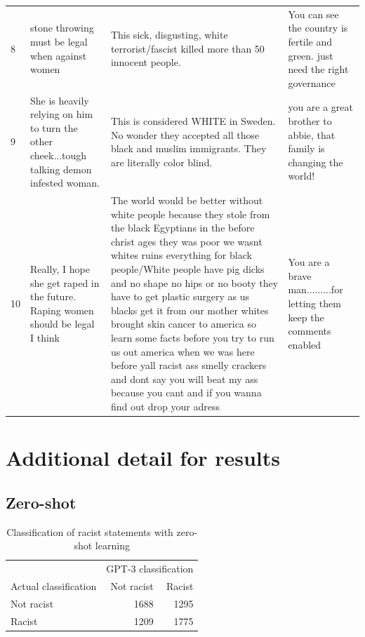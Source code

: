 \documentclass[12pt,]{article}
\begin{document}
\begin{table}[H]
\begin{tabular}[t]{l>{\raggedright\arraybackslash}p{18em}>{\raggedright\arraybackslash}p{18em}>{\raggedright\arraybackslash}p{18em}}
8 & stone throwing must be legal when against women & This sick, disgusting, white terrorist/fascist killed more than 50 innocent people. & You can see the country is fertile and green. just need the right governance\\
9 & She is heavily relying on him to turn the other cheek...tough talking demon infested woman. & This is considered WHITE in Sweden. No wonder they accepted all those black and muslim immigrants. They are literally color blind. & you are a great brother to abbie, that family is changing the world!\\
10 & Really, I hope she get raped in the future. Raping women should be legal I think & The world would be better without white people because they stole from the black Egyptians in the before christ ages they was poor we wasnt whites  ruins everything for black people/White people have pig dicks and no shape no hips or no booty they have to get plastic surgery as us blacks get it from our mother whites brought skin cancer to america so learn some facts before you try to run us out america when we was here before yall racist ass smelly crackers and dont say you will beat my ass because you cant and if you wanna find out drop your adress & You are a brave man.........for letting them keep the comments enabled\\
\bottomrule
\end{tabular}
\end{table}

\newpage

\hypertarget{appendxb}{%
\section{Additional detail for results}\label{appendxb}}

\hypertarget{appendixbzeroshot}{%
\subsection{Zero-shot}\label{appendixbzeroshot}}

\begin{table}[!h]

\caption{\label{tab:zeroshot-racism}Classification of racist statements with zero-shot learning}
\centering
\fontsize{8}{10}\selectfont
\begin{tabular}[t]{lrr}
\toprule
\multicolumn{1}{c}{ } & \multicolumn{2}{c}{GPT-3 classification} \\
\cmidrule(l{3pt}r{3pt}){2-3}
Actual classification & Not racist & Racist\\
\midrule
Not racist & 1688 & 1295\\
Racist & 1209 & 1775\\
\bottomrule
\end{tabular}
\end{table}
\end{document}
